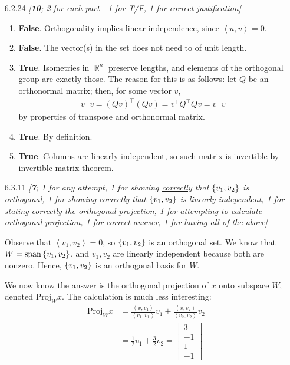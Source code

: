 \documentclass{amsart}
\theoremstyle{definition}
\theoremstyle{definition}
\DeclareMathOperator{\R}{\mathbb{R}}
\DeclareMathOperator{\1}{\mathbbm{1}}
\DeclareMathOperator{\Span}{span}
\newcommand{\innerproduct}[2]{\left\langle #1,#2 \right\rangle}
\newcommand{\proj}[2]{\mathrm{Proj}_{#1} {#2} }
\begin{document}
\begin{enumerate}[itemsep = 2mm]
		
		
		\item[6.2.24] \textit{[\textbf{10}; 2 for each part---1 for T/F, 1 for correct justification]}
		
		\begin{enumerate}[label = (\alph*)]
			\item \textbf{False}. Orthogonality implies linear independence, since $\innerproduct{u}{v} = 0$.
			
			\item \textbf{False}. The vector(s) in the set does not need to of unit length.
			
			\item \textbf{True}. Isometries in $\R^n$ preserve lengths, and elements of the orthogonal group are exactly those. The reason for this is as follows: let $Q$ be an orthonormal matrix; then, for some vector $v$,
			\begin{align*}
				v^\intercal v = (Qv)^\intercal (Qv) = v^\intercal Q^\intercal Q v = v^\intercal v
			\end{align*}
			by properties of transpose and orthonormal matrix.
			
			\item \textbf{True}. By definition.
			
			\item \textbf{True}. Columns are linearly independent, so such matrix is invertible by invertible matrix theorem.
		\end{enumerate}
		
		
		
		\item[6.3.11] \textit{[\textbf{7}; 1 for any attempt, 1 for showing \uline{correctly} that $\set{v_1,v_2}$ is orthogonal, 1 for showing \uline{correctly} that $\set{v_1,v_2}$ is linearly independent, 1 for stating \uline{correctly} the orthogonal projection, 1 for attempting to calculate orthogonal projection, 1 for correct answer, 1 for having all of the above]}
		
		Observe that $\innerproduct{v_1}{v_2} = 0$, so $\set{v_1,v_2}$ is an orthogonal set. We know that $W = \Span \set{v_1,v_2}$, and $v_1,v_2$ are linearly independent because both are nonzero. Hence, $\set{v_1,v_2}$ is an orthogonal basis for $W$.
		
		We now know the answer is the orthogonal projection of $x$ onto subspace $W$, denoted $\proj{W}{x}$. The calculation is much less interesting:
		\begin{align*}
			\proj{W}{x} &= \frac{\innerproduct{x}{v_1}}{\innerproduct{v_1}{v_1}} v_1 + \frac{\innerproduct{x}{v_2}}{\innerproduct{v_2}{v_2}} v_2 \\
			&= \frac{1}{2} v_1 + \frac{3}{2} v_2 = \begin{bmatrix}
			3 \\ -1 \\ 1 \\ -1
			\end{bmatrix}
		\end{align*}
		

\end{enumerate}
\end{document}
